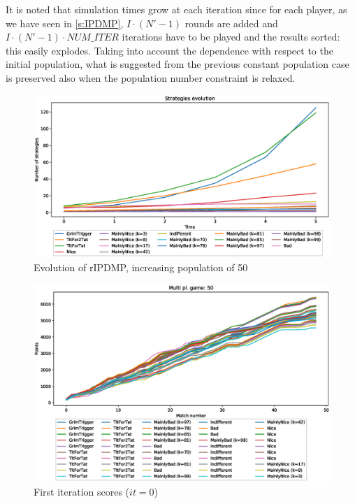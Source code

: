 \documentclass[journal,10pt,twoside]{IEEEtran}
\begin{document}
It is noted that simulation times grow at each iteration since for each player, as we have seen in \autoref{s:IPDMP}, $I\cdot(N'-1)$ rounds are added and $I\cdot(N'-1)\cdot{NUM\_ITER}$ iterations have to be played and the results sorted: this easily explodes. Taking into account the dependence with respect to the initial population, what is suggested from the previous constant population case is preserved also when the population number constraint is relaxed.

\begin{figure}[!ht]
    \centering
    \includegraphics[width=1\columnwidth]{../img/ripdmp-incr/ripdmp-evolution-increasing-pop-50}
    \caption{Evolution of rIPDMP, increasing population of 50}
    \label{fig:incrR}
\end{figure}

\begin{figure}[!ht]
    \centering
    \includegraphics[width=1\columnwidth]{../img/ripdmp-incr/ripdmp-scores-increasing-pop-50-r0}
    \caption{First iteration scores ($it=0$)}
    \label{fig:incrFI}
\end{figure}
\end{document}
